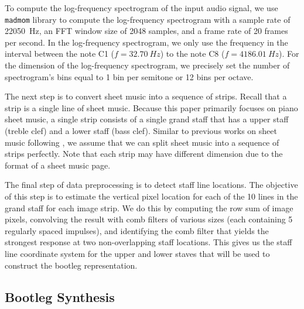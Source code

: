 \documentclass[letterpaper, 10pt, conference]{ieeeconf}  %
\begin{document}
To compute the log-frequency spectrogram of the input audio signal, we use \texttt{madmom} library \cite{madmom} to compute the log-frequency spectrogram with a sample rate of \SI{22050}{Hz}, an FFT window size of 2048 samples, and a frame rate of 20 frames per second. In the log-frequency spectrogram, we only use the frequency in the interval between the note C1 ($f = \SI{32.70}{Hz}$) to the note C8 ($f = \SI{4186.01}{Hz}$). For the dimension of the log-frequency spectrogram, we precisely set the number of spectrogram's bins equal to 1 bin per semitone or 12 bins per octave.

The next step is to convert sheet music into a sequence of strips. Recall that a strip is a single line of sheet music. Because this paper primarily focuses on piano sheet music, a single strip consists of a single grand staff that has a upper staff (treble clef) and a lower staff (bass clef). Similar to previous works on sheet music following \cite{dorfer,dorfer2,dorfer3,msmd}, we assume that we can split sheet music into a sequence of strips perfectly. Note that each strip may have different dimension due to the format of a sheet music page.

The final step of data preprocessing is to detect staff line locations. The objective of this step is to estimate the vertical pixel location for each of the 10 lines in the grand staff for each image strip. We do this by computing the row sum of image pixels, convolving the result with comb filters of various sizes (each containing 5 regularly spaced impulses), and identifying the comb filter that yields the strongest response at two non-overlapping staff locations. This gives us the staff line coordinate system for the upper and lower staves that will be used to construct the bootleg representation.

\subsection{Bootleg Synthesis}
\end{document}
